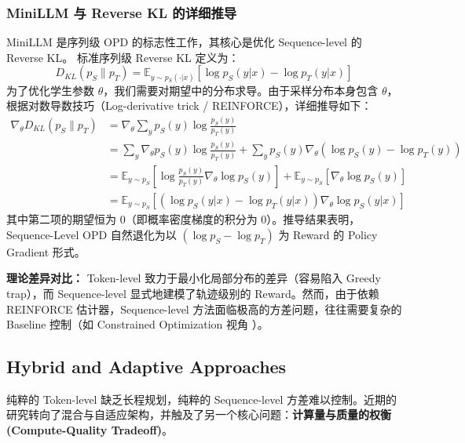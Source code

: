 \documentclass{article}
\begin{document}
\subsubsection{MiniLLM 与 Reverse KL 的详细推导 \cite{2306.08543}}
MiniLLM 是序列级 OPD 的标志性工作，其核心是优化 Sequence-level 的 Reverse KL。
标准序列级 Reverse KL 定义为：
\begin{equation}
    D_{KL}(p_S \parallel p_T) = \mathbb{E}_{y \sim p_S(\cdot|x)} \left[ \log p_S(y|x) - \log p_T(y|x) \right]
\end{equation}
为了优化学生参数 $\theta$，我们需要对期望中的分布求导。由于采样分布本身包含 $\theta$，根据对数导数技巧（Log-derivative trick / REINFORCE），详细推导如下：
\begin{align}
    \nabla_\theta D_{KL}(p_S \parallel p_T) &= \nabla_\theta \sum_y p_S(y) \log \frac{p_S(y)}{p_T(y)} \nonumber \\
    &= \sum_y \nabla_\theta p_S(y) \log \frac{p_S(y)}{p_T(y)} + \sum_y p_S(y) \nabla_\theta (\log p_S(y) - \log p_T(y)) \nonumber \\
    &= \mathbb{E}_{y \sim p_S} \left[ \log \frac{p_S(y)}{p_T(y)} \nabla_\theta \log p_S(y) \right] + \mathbb{E}_{y \sim p_S} \left[ \nabla_\theta \log p_S(y) \right] \nonumber \\
    &= \mathbb{E}_{y \sim p_S} \left[ \left(\log p_S(y|x) - \log p_T(y|x)\right) \nabla_\theta \log p_S(y|x) \right]
\end{align}
其中第二项的期望恒为 0（即概率密度梯度的积分为 0）。推导结果表明，Sequence-Level OPD 自然退化为以 $(\log p_S - \log p_T)$ 为 Reward 的 Policy Gradient 形式。

\textbf{理论差异对比：} Token-level 致力于最小化局部分布的差异（容易陷入 Greedy trap），而 Sequence-level 显式地建模了轨迹级别的 Reward。然而，由于依赖 REINFORCE 估计器，Sequence-level 方法面临极高的方差问题，往往需要复杂的 Baseline 控制（如 Constrained Optimization 视角 \cite{2509.22921}）。

\subsection{Hybrid and Adaptive Approaches}
\label{subsec:hybrid}

纯粹的 Token-level 缺乏长程规划，纯粹的 Sequence-level 方差难以控制。近期的研究转向了混合与自适应架构，并触及了另一个核心问题：\textbf{计算量与质量的权衡 (Compute-Quality Tradeoff)}。
\end{document}

